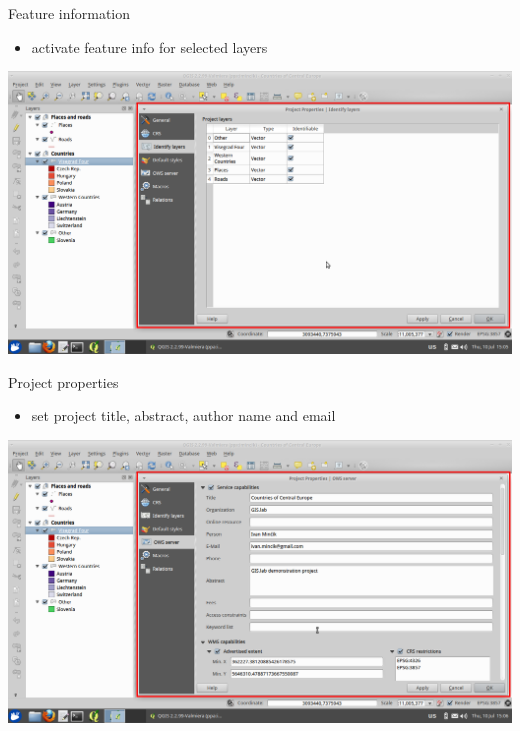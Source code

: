 \documentclass[12pt]{beamer}
\begin{document}
\begin{frame}{Feature information}
	\begin{itemize}
		\item activate feature info for selected layers
	\end{itemize}
	\begin{center}
		\includegraphics[keepaspectratio=true,height=0.6\textheight]{images/rapid-gis-deployment/project-feature-info.png}
	\end{center}
\end{frame}


\begin{frame}{Project properties}
	\begin{itemize}
		\item set project title, abstract, author name and email
	\end{itemize}
	\begin{center}
		\includegraphics[keepaspectratio=true,height=0.6\textheight]{images/rapid-gis-deployment/project-properties.png}
	\end{center}
\end{frame}
\end{document}
